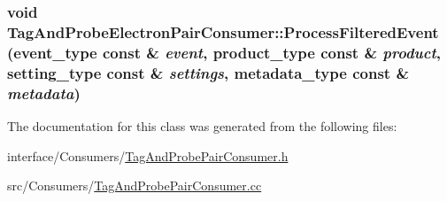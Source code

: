 \hypertarget{classTagAndProbeElectronPairConsumer_afc01b5796584a80d328d00454fc8f8dc}{
\subsubsection[{ProcessFilteredEvent}]{\setlength{\rightskip}{0pt plus 5cm}void TagAndProbeElectronPairConsumer::ProcessFilteredEvent (event\_\-type const \& {\em event}, \/  product\_\-type const \& {\em product}, \/  setting\_\-type const \& {\em settings}, \/  metadata\_\-type const \& {\em metadata})}}
\label{classTagAndProbeElectronPairConsumer_afc01b5796584a80d328d00454fc8f8dc}


The documentation for this class was generated from the following files:\begin{DoxyCompactItemize}
\item 
interface/Consumers/\hyperlink{TagAndProbePairConsumer_8h}{TagAndProbePairConsumer.h}\item 
src/Consumers/\hyperlink{TagAndProbePairConsumer_8cc}{TagAndProbePairConsumer.cc}\end{DoxyCompactItemize}
